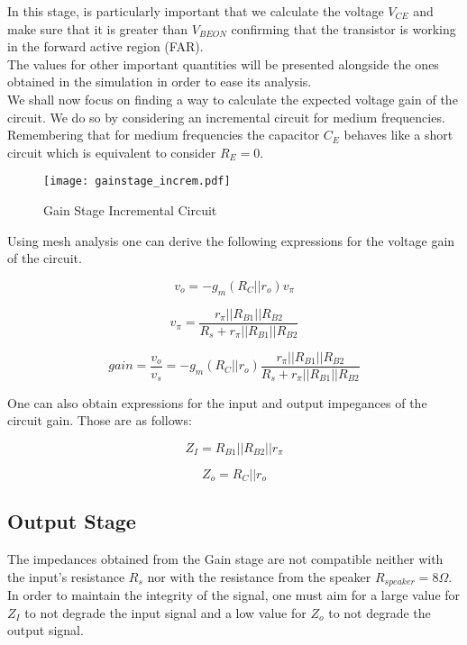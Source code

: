 In this stage, is particularly important that we calculate the voltage $V_{CE}$ and make sure that it is greater than $V_{BEON}$ confirming that the transistor is working in the forward active region (FAR).\\

The values for other important quantities will be presented alongside the ones obtained in the simulation in order to ease its analysis.\\

We shall now focus on finding a way to calculate the expected voltage gain of the circuit. We do so by considering an incremental circuit for medium frequencies. Remembering that for medium frequencies the capacitor $C_E$ behaves like a short circuit which is equivalent to consider $R_E=0$.

\begin{figure}[H]
\centering
\texttt{[image: gainstage\_increm.pdf]}
\caption{Gain Stage Incremental Circuit}
\label{fig:gain_stage_incremental_circuit}
\end{figure}

Using mesh analysis one can derive the following expressions for the voltage gain of the circuit.

\begin{equation}
v_o=-g_m(R_C||r_o)v_{\pi}
\end{equation}

\begin{equation}
v_{\pi}=\frac{r_{\pi}||R_{B1}||R_{B2}}{R_s+r_{\pi}||R_{B1}||R_{B2}}
\end{equation}

\begin{equation}
gain=\frac{v_o}{v_s}=-g_m(R_C||r_o)\frac{r_{\pi}||R_{B1}||R_{B2}}{R_s+r_{\pi}||R_{B1}||R_{B2}}
\end{equation}

One can also obtain expressions for the input and output impegances of the circuit gain. Those are as follows:


\begin{equation}
Z_I=R_{B1}||R_{B2}||r_{\pi}
\end{equation}

\begin{equation}
Z_o=R_C||r_o
\end{equation}

\subsection{Output Stage}
The impedances obtained from the Gain stage are not compatible neither with the input's resistance $R_s$ nor with the resistance from the speaker $R_{speaker}=8\Omega$. In order to maintain the integrity of the signal, one must aim for a large value for $Z_I$ to not degrade the input signal and a low value for $Z_o$ to not degrade the output signal.\\


